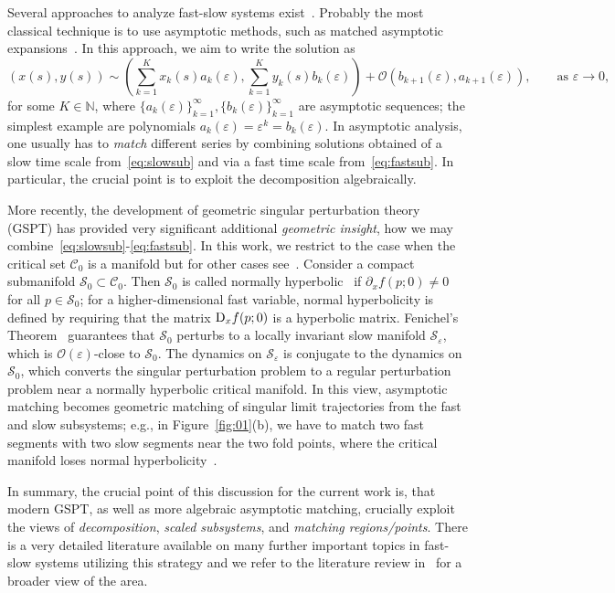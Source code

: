\documentclass[12pt]{article}
\def\N{\mathbb{N}}
\def\I{\infty}
\def\txtD{{\textnormal{D}}}
\newcommand{\benn}{\begin{equation*}}
\newcommand{\eenn}{\end{equation*}}
\def\ra{\rightarrow}
\def\I{\infty}
\newcommand{\cC}{{\mathcal C}}  %
\newcommand{\cO}{{\mathcal O}}  %
\newcommand{\cS}{{\mathcal S}}  %
\begin{document}
Several approaches to analyze fast-slow systems exist~\cite{KuehnBook}. Probably
the most classical technique is to use asymptotic methods, such as matched 
asymptotic expansions~\cite{MisRoz,KevorkianCole,BenderOrszag}. In this approach,
we aim to write the solution as
\benn
(x(s),y(s))\sim \left(\sum_{k=1}^Kx_k(s)a_k(\varepsilon),\sum_{k=1}^Ky_k(s)
b_k(\varepsilon)\right)+\cO(b_{k+1}(\varepsilon),a_{k+1}(\varepsilon)), 
\qquad \text{as $\varepsilon\ra 0$,}
\eenn  
for some $K\in\N$, where $\{a_k(\varepsilon)\}_{k=1}^\I,\{b_k(\varepsilon)\}_{k=1}^\I$
are asymptotic sequences; the simplest example are polynomials 
$a_k(\varepsilon)=\varepsilon^k=b_k(\varepsilon)$. In asymptotic analysis, one
usually has to \emph{match} different series by combining solutions obtained of
a slow time scale from~\eqref{eq:slowsub} and via a fast time scale from~\eqref{eq:fastsub}.
In particular, the crucial point is to exploit the decomposition algebraically.\medskip

More recently, the development of geometric singular perturbation theory (GSPT)
has provided very significant additional \emph{geometric insight}, how we may
combine~\eqref{eq:slowsub}-\eqref{eq:fastsub}. In this work, we restrict to the 
case when the critical set $\cC_0$ is a manifold but 
for other cases see~\cite{KruSzm4,Schecter,KuehnSzmolyan}. Consider a compact 
submanifold $\cS_0\subset \cC_0$. Then $\cS_0$ is called normally 
hyperbolic~\cite{Fenichel4,Jones,Kaper} if $\partial_x f(p;0)\neq 0$ for all $p\in\cS_0$; 
for a higher-dimensional fast variable, normal hyperbolicity is defined by requiring that 
the matrix $\txtD_x f(p;0)$ is a hyperbolic matrix. Fenichel's 
Theorem~\cite{Fenichel4,Jones,WigginsIM} guarantees that $\cS_0$ perturbs to a locally 
invariant slow manifold $\cS_\varepsilon$, which is $\cO(\varepsilon)$-close 
to $\cS_0$. The dynamics on $\cS_\varepsilon$ is conjugate to 
the dynamics on $\cS_0$, which converts the singular perturbation problem to a regular 
perturbation problem near a normally hyperbolic critical manifold. In this view,
asymptotic matching becomes geometric matching of singular limit trajectories from 
the fast and slow subsystems; e.g., in Figure~\ref{fig:01}(b), we have to match two fast
segments with two slow segments near the two fold points, where the critical 
manifold loses normal hyperbolicity~\cite{KuehnBook}.\medskip

In summary, the crucial point of this discussion for the current work is, that
modern GSPT, as well as more algebraic asymptotic matching, crucially exploit the views
of \emph{decomposition}, \emph{scaled subsystems}, and \emph{matching regions/points}. 
There is a very detailed literature available on many further important topics in 
fast-slow systems utilizing this strategy and we refer to the literature review 
in~\cite{KuehnBook} for a broader view of the area.\medskip
\end{document}

